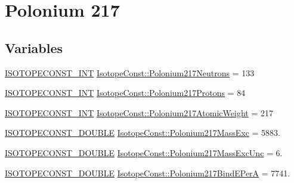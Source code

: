 \hypertarget{group___isotope_const-_polonium-_po217}{}\section{Polonium 217}
\label{group___isotope_const-_polonium-_po217}
\subsection*{Variables}
\begin{DoxyCompactItemize}
\item 
\mbox{\hyperlink{group___isotope_const-_macros_ga5f18360b3e99483a35c32d789e62621c}{I\+S\+O\+T\+O\+P\+E\+C\+O\+N\+S\+T\+\_\+\+I\+NT}} \mbox{\hyperlink{group___isotope_const-_polonium-_po217_gaad526a8da8f933079c3418dad1dd6eb3}{Isotope\+Const\+::\+Polonium217\+Neutrons}} = 133
\item 
\mbox{\hyperlink{group___isotope_const-_macros_ga5f18360b3e99483a35c32d789e62621c}{I\+S\+O\+T\+O\+P\+E\+C\+O\+N\+S\+T\+\_\+\+I\+NT}} \mbox{\hyperlink{group___isotope_const-_polonium-_po217_gad0a5988136b3c297a0f94b408d293120}{Isotope\+Const\+::\+Polonium217\+Protons}} = 84
\item 
\mbox{\hyperlink{group___isotope_const-_macros_ga5f18360b3e99483a35c32d789e62621c}{I\+S\+O\+T\+O\+P\+E\+C\+O\+N\+S\+T\+\_\+\+I\+NT}} \mbox{\hyperlink{group___isotope_const-_polonium-_po217_ga81925bd1859bf3389a88f0e1e55443ed}{Isotope\+Const\+::\+Polonium217\+Atomic\+Weight}} = 217
\item 
\mbox{\hyperlink{group___isotope_const-_macros_ga8f45a7272ce02c0b4c65c44636ed719a}{I\+S\+O\+T\+O\+P\+E\+C\+O\+N\+S\+T\+\_\+\+D\+O\+U\+B\+LE}} \mbox{\hyperlink{group___isotope_const-_polonium-_po217_gac0b2142f139ff381c21bd914f59b2041}{Isotope\+Const\+::\+Polonium217\+Mass\+Exc}} = 5883.
\item 
\mbox{\hyperlink{group___isotope_const-_macros_ga8f45a7272ce02c0b4c65c44636ed719a}{I\+S\+O\+T\+O\+P\+E\+C\+O\+N\+S\+T\+\_\+\+D\+O\+U\+B\+LE}} \mbox{\hyperlink{group___isotope_const-_polonium-_po217_ga5fa3a36d6d9a4d0c55f17bf97e469d39}{Isotope\+Const\+::\+Polonium217\+Mass\+Exc\+Unc}} = 6.
\item 
\mbox{\hyperlink{group___isotope_const-_macros_ga8f45a7272ce02c0b4c65c44636ed719a}{I\+S\+O\+T\+O\+P\+E\+C\+O\+N\+S\+T\+\_\+\+D\+O\+U\+B\+LE}} \mbox{\hyperlink{group___isotope_const-_polonium-_po217_gab2fff05deb17d6f067f0ec5b2e23594b}{Isotope\+Const\+::\+Polonium217\+Bind\+E\+PerA}} = 7741.
\item 

\end{DoxyCompactItemize}
